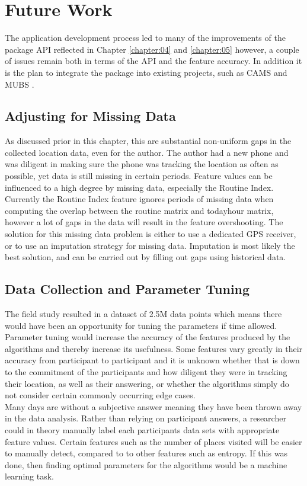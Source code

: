 \clearpage
\section{Future Work}
The application development process led to many of the improvements of the package API reflected in Chapter \ref{chapter:04} and \ref{chapter:05} however, a couple of issues remain both in terms of the API and the feature accuracy. In addition it is the plan to integrate the package into existing projects, such as CAMS \cite{CAMS} and MUBS \cite{mubs-rohani}.

\subsection{Adjusting for Missing Data}
As discussed prior in this chapter, this are substantial non-uniform gaps in the collected location data, even for the author. The author had a new phone and was diligent in making sure the phone was tracking the location as often as possible, yet data is still missing in certain periods. Feature values can be influenced to a high degree by missing data, especially the Routine Index. Currently the Routine Index feature ignores periods of missing data when computing the overlap between the routine matrix and today\s hour matrix, however a lot of gaps in the data will result in the feature overshooting. The solution for this missing data problem is either to use a dedicated GPS receiver, or to use an imputation strategy for missing data. Imputation is most likely the best solution, and can be carried out by filling out gaps using historical data. 

\subsection{Data Collection and Parameter Tuning}
The field study resulted in a dataset of 2.5M data points which means there would have been an opportunity for tuning the parameters if time allowed. Parameter tuning would increase the accuracy of the features produced by the algorithms and thereby increase its usefulness. Some features vary greatly in their accuracy from participant to participant and it is unknown whether that is down to the commitment of the participants and how diligent they were in tracking their location, as well as their answering, or whether the algorithms simply do not consider certain commonly occurring edge cases.\\

Many days are without a subjective answer meaning they have been thrown away in the data analysis. Rather than relying on participant answers, a researcher could in theory manually label each participants data sets with appropriate feature values. Certain features such as the number of places visited will be easier to manually detect, compared to to other features such as entropy. If this was done, then finding optimal parameters for the algorithms would be a machine learning task. \\

